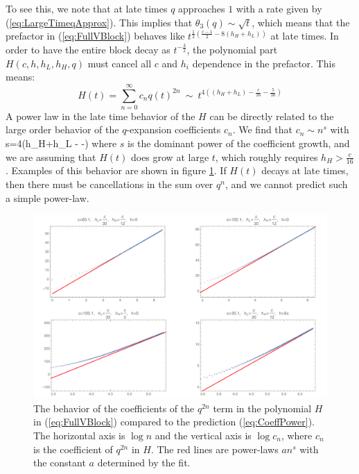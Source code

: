 To see this, we note that at late times $q$ approaches $1$ with a rate given by (\ref{eq:LargeTimeqApprox}). This implies that $\theta_{3}(q)\sim\sqrt{t}$, which means that the prefactor in (\ref{eq:FullVBlock}) behaves like  $t^{\frac{1}{2}\left(\frac{c-1}{2}-8(h_{H}+h_{L})\right)}$ at late times. In order to have the entire block decay as $t^{-\frac{3}{2}}$, the polynomial part $H\left(c,h,h_L, h_H ,q\right)$ must  cancel all $c$ and $h_i$ dependence in the prefactor. This means: 
\begin{equation}
H(t)={\displaystyle \sum_{n=0}^{\infty}}c_{n}q(t)^{2n} \ \sim \ t^{4\left((h_{H}+h_{L})-\frac{c}{16}-\frac{5}{16}\right)}\label{eq:PowerSum}
\end{equation}
A power law in the late time behavior of the $H$ can be directly related to the large order behavior of the $q$-expansion coefficients $c_n$.  We find that $c_{n} \sim n^{s}$ with 
\be
\label{eq:CoeffPower}
s=4\left(h_{H}+h_{L} - -\right)
\ee
where $s$ is the dominant power of the coefficient growth, and we are assuming that $H(t)$ does grow at large $t$, which roughly requires $h_H > \frac{c}{16}$. Examples of this behavior are shown in figure \ref{fig:Coeffpower}.  
 If $H(t)$ decays at late times, then there must be cancellations in the sum over $q^n$, and we cannot predict such a simple power-law.

\begin{figure}[H]
\centering{}
\includegraphics[scale=0.5]{virasoro_chapter/Coeffpower}
\caption[Asymptotic power law behavior of $q$-expansion coefficients]{The behavior of the coefficients of the $q^{2n}$ term in the polynomial $H$ in (\ref{eq:FullVBlock}) compared to the prediction (\ref{eq:CoeffPower}). The horizontal axis is $\log n$ and the vertical axis is $\log c_{n}$, where $c_n$ is the coefficient of $q^{2n}$ in $H$. The red lines are power-laws $a n^s$ with the constant $a$ determined by the fit. 
\label{fig:Coeffpower}}
\end{figure}

